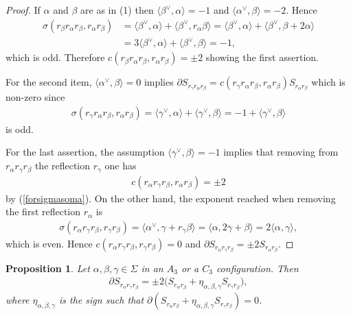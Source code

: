 \documentclass[10pt,a4paper]{amsart}
\numberwithin{equation}{section}
\newtheorem{Proposition}[Theorem]{Proposition}
 { \theoremstyle{definition}
\newtheorem{Definition}[Theorem]{Definition}
\newtheorem{Note}[Theorem]{Note}
\newtheorem{Example}[Theorem]{Example}
\newtheorem{Remark}[Theorem]{Remark} }
\begin{document}
\begin{proof}If $\alpha $ and $\beta $ are as in (1) then $\langle \beta ^{\vee},\alpha \rangle =-1$ and $\langle \alpha ^{\vee },\beta\rangle =-2$. Hence
\begin{align*}
\sigma ( r_{\beta }r_{\alpha }r_{\beta },r_{\alpha }r_{\beta } )&=\langle \beta ^{\vee },\alpha \rangle +\langle \beta ^{\vee },r_{\alpha}\beta \rangle =\langle \beta ^{\vee },\alpha \rangle +\langle \beta ^{\vee },\beta
+2\alpha \rangle \\
&=3\langle \beta ^{\vee },\alpha \rangle +\langle \beta ^{\vee },\beta\rangle =-1,
\end{align*}
which is odd. Therefore $c ( r_{\beta }r_{\alpha }r_{\beta },r_{\alpha}r_{\beta } ) =\pm 2$ showing the first assertion.

For the second item, $ \langle \alpha ^{\vee },\beta \rangle =0$ implies $\partial S_{r_{\gamma }r_{\alpha }r_{\beta }}=c(r_{\gamma}r_{\alpha }r_{\beta },r_{\alpha }r_{\beta })S_{r_{\alpha }r_{\beta }}$ which is non-zero since
\begin{gather*}
\sigma (r_{\gamma }r_{\alpha }r_{\beta },r_{\alpha }r_{\beta })= \langle \gamma ^{\vee },\alpha \rangle + \langle \gamma ^{\vee },\beta \rangle =-1+ \langle \gamma ^{\vee },\beta \rangle
\end{gather*}
is odd.

For the last assertion, the assumption $\langle \gamma ^{\vee },\beta \rangle =-1$ implies that removing from $r_{\alpha }r_{\gamma }r_{\beta }$ the reflection $r_{\gamma }$ one has
\begin{gather*}
c ( r_{\alpha }r_{\gamma }r_{\beta },r_{\alpha }r_{\beta } ) =\pm 2
\end{gather*}%
by (\ref{forsigmasoma}). On the other hand, the exponent reached when removing the first reflection $r_{\alpha }$ is
\begin{gather*}
\sigma ( r_{\alpha }r_{\gamma }r_{\beta },r_{\gamma }r_{\beta } ) =\langle \alpha ^{\vee },\gamma +r_{\gamma }\beta \rangle =\langle \alpha,2\gamma +\beta \rangle =2\langle \alpha,\gamma \rangle,
\end{gather*}
which is even. Hence $c ( r_{\alpha }r_{\gamma }r_{\beta },r_{\gamma}r_{\beta } ) =0$ and $\partial S_{r_{\alpha }r_{\gamma }r_{\beta}}=\pm 2S_{r_{\alpha }r_{\beta }}$.
\end{proof}

\begin{Proposition}\label{pro.bound3A3}Let $\alpha,\beta,\gamma \in \Sigma $ in an $A_{3}$ or a $C_{3}$ configuration. Then
\begin{gather*}
\partial S_{r_{\alpha }r_{\gamma }r_{\beta }}=\pm 2\big( S_{r_{\alpha}r_{\beta }}+\eta _{\alpha,\beta,\gamma }S_{r_{\gamma }r_{\beta }}\big),
\end{gather*}
where $\eta _{\alpha,\beta,\gamma }$ is the sign such that $\partial ( S_{r_{\alpha }r_{\beta }}+\eta _{\alpha,\beta,\gamma }S_{r_{\gamma}r_{\beta }}) =0$.
\end{Proposition}
\end{document}
